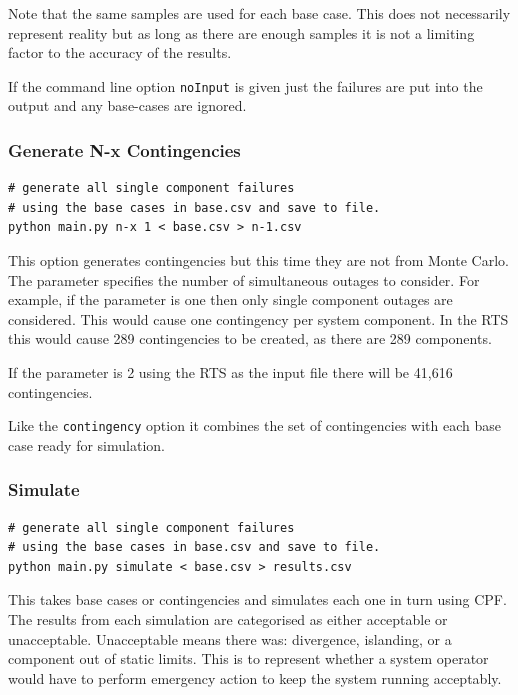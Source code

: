 \documentclass[a4paper,oneside,12pt]{report}
\begin{document}
Note that the same samples are used for each base case. This does not
necessarily represent reality but as long as there are enough samples
it is not a limiting factor to the accuracy of the results.

If the command line option \texttt{noInput} is given just the failures
are put into the output and any base-cases are ignored.

\subsubsection{Generate N-x Contingencies}

\begin{verbatim}
# generate all single component failures
# using the base cases in base.csv and save to file.
python main.py n-x 1 < base.csv > n-1.csv
\end{verbatim}

This option generates contingencies but this time they are not from
Monte Carlo. The parameter specifies the number of simultaneous outages
to consider. For example, if the parameter is one then only single
component outages are considered. This would cause one contingency per
system component. In the RTS this would cause 289 contingencies to be
created, as there are 289 components.

If the parameter is 2 using the RTS as the input file there will be
41,616 contingencies.

Like the \texttt{contingency} option it combines the set of
contingencies with each base case ready for simulation.

\subsubsection{Simulate}

\begin{verbatim}
# generate all single component failures
# using the base cases in base.csv and save to file.
python main.py simulate < base.csv > results.csv
\end{verbatim}

This takes base cases or contingencies and simulates each one in turn using
CPF. The results from each simulation are categorised as either
acceptable or unacceptable. Unacceptable means there was: divergence,
islanding, or a component out of static limits. This is to represent
whether a system operator would have to perform emergency action to keep
the system running acceptably.
\end{document}
